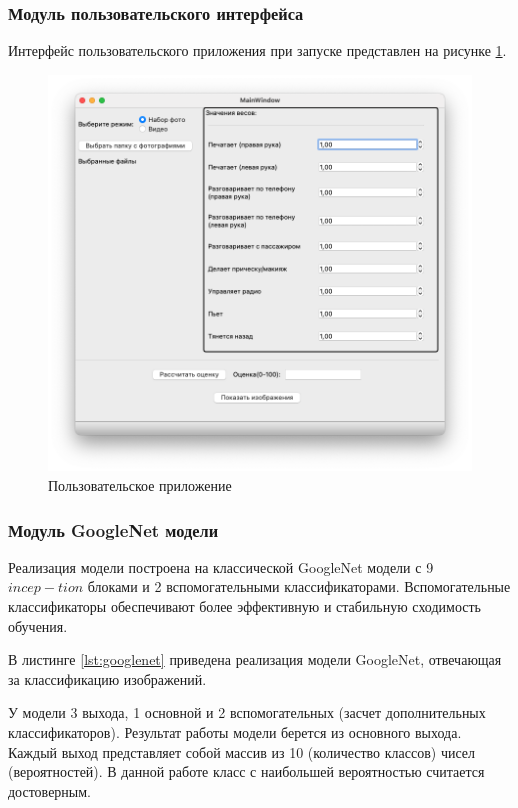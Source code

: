 \subsubsection{Модуль пользовательского интерфейса}
Интерфейс пользовательского приложения при запуске представлен на рисунке \ref{fig:example_app}.
\begin{figure}[hbtp]
	\centering
	\includegraphics[scale=0.55]{img/example_app.png}
	\caption{Пользовательское приложение}
	\label{fig:example_app}
\end{figure}
\clearpage

\subsubsection{Модуль GoogleNet модели}
Реализация модели построена на классической GoogleNet модели с 9 $incep-tion$ блоками и 2 вспомогательными классификаторами. Вспомогательные классификаторы обеспечивают более эффективную и стабильную сходимость обучения.

В листинге \ref{lst:googlenet} приведена реализация модели GoogleNet, отвечающая за классификацию изображений.

У модели 3 выхода, 1 основной и 2 вспомогательных (засчет дополнительных классификаторов). Результат работы модели берется из основного выхода. Каждый выход представляет собой массив из 10 (количество классов) чисел (вероятностей). В данной работе класс с наибольшей вероятностью считается достоверным.

